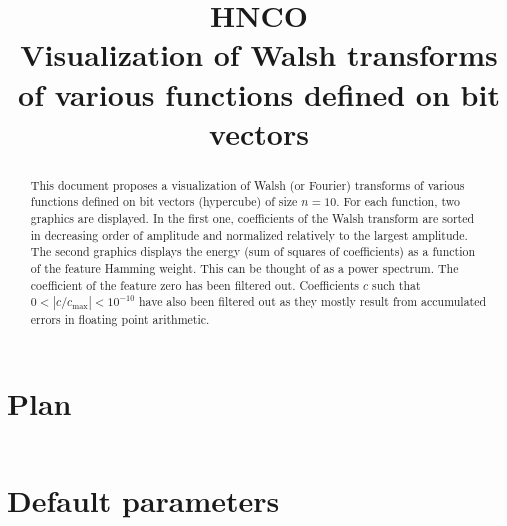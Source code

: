 \documentclass[a4paper]{article}
\begin{document}

\title{HNCO\\
  Visualization of Walsh transforms\\
  of various functions defined on bit vectors}
\maketitle

\begin{abstract}
  This document proposes a visualization of Walsh (or Fourier)
  transforms of various functions defined on bit vectors (hypercube)
  of size $n=10$. For each function, two graphics are displayed. In
  the first one, coefficients of the Walsh transform are sorted in
  decreasing order of amplitude and normalized relatively to the
  largest amplitude. The second graphics displays the energy (sum of
  squares of coefficients) as a function of the feature Hamming
  weight. This can be thought of as a power spectrum. The coefficient
  of the feature zero has been filtered out. Coefficients $c$ such
  that $0 < |c/c_{\max}| < 10^{-10}$ have also been filtered out as
  they mostly result from accumulated errors in floating point
  arithmetic.
\end{abstract}

\tableofcontents



\appendix

\section{Plan}

\inputminted[breaklines=true]{json}{pretty.json}

\section{Default parameters}

\inputminted[breaklines=true]{text}{../log.defaults}
\end{document}
